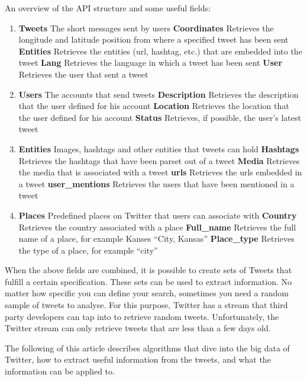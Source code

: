 \documentclass{article}
\begin{document}
An overview of the API structure and some useful fields:
\begin{enumerate}
\item \textbf{Tweets} The short messages sent by users
	\subitem \textbf{Coordinates} Retrieves the longitude and latitude position from where a specified tweet has been sent
	\subitem \textbf{Entities} Retrieves the entities (url, hashtag, etc.) that are embedded into the tweet
	\subitem \textbf{Lang} Retrieves the language in which a tweet has been sent
	\subitem \textbf{User} Retrieves the user that sent a tweet
\item \textbf{Users} The accounts that send tweets
	\subitem \textbf{Description} Retrieves the description that the user defined for his account
	\subitem \textbf{Location} Retrieves the location that the user defined for his account
	\subitem \textbf{Status} Retrieves, if possible, the user's latest tweet
\item \textbf{Entities} Images, hashtags and other entities that tweets can hold
	\subitem \textbf{Hashtags} Retrieves the hashtags that have been parset out of a tweet
	\subitem \textbf{Media} Retrieves the media that is associated with a tweet
	\subitem \textbf{urls} Retrieves the urls embedded in a tweet
	\subitem \textbf{user\_mentions} Retrieves the users that have been mentioned in a tweet
\item \textbf{Places} Predefined places on Twitter that users can associate with
	\subitem \textbf{Country} Retrieves the country associated with a place
	\subitem \textbf{Full\_name} Retrieves the full name of a place, for example Kanses ``City, Kansas''
	\subitem \textbf{Place\_type} Retrieves the type of a place, for example ``city''
\end{enumerate}

When the above fields are combined, it is possible to create sets of Tweets that fulfill a certain specification. These sets can be used to extract information.
No matter how specific you can define your search, sometimes you need a random sample of tweets to analyse. For this purpose, Twitter has a stream that
third party developers can tap into to retrieve random tweets. Unfortunately, the Twitter stream can only retrieve tweets that are less than a few days old.

The following of this article describes algorithms that dive into the big data of Twitter, how to extract useful information from the tweets, and what the information
can be applied to.

\newpage
\end{document}
